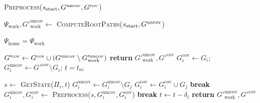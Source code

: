 \documentclass[conference]{IEEEtran}
\begin{document}
\begin{algorithm}
\caption{\textsc{Preprocess}($s_{\textrm{start}},G^{\textrm{uncov}},G^{\textrm{cov}} $)}\label{alg:2}
\begin{algorithmic}[1]
\State $\Psi_{\textrm{work}}, G'^{\textrm{uncov}}_{\textrm{work}} \leftarrow$ \textsc{ComputeRootPaths}($s_{\textrm{start}},G^{\textrm{uncov}}$)

\If {$\Sstart = \Shome$}
    \State $\Psi_{\textrm{home}} = \Psi_{\textrm{work}}$
\EndIf

\State $G'^{\textrm{cov}} \leftarrow 
    G^{\textrm{cov}} \cup (G^{\textrm{uncov}} \setminus G'^{\textrm{uncov}}_{\textrm{work}})$
    \State \textbf{return} $G'^{\textrm{uncov}}_{\textrm{work}}, G'^{\textrm{cov}}$
\EndIf
{}
    \State $G_i^{\textrm{cov}} \leftarrow G_i$;
            \hspace{2mm}
           $G_i^{\textrm{uncov}} \leftarrow G'^{\textrm{cov}} \setminus G_i$;
            \hspace{2mm}
           $t = t_{\textrm{rc}}$

        \State $s \leftarrow$ \textsc{GetState($\Pi_i, t$)}
                \State $G_i^{\textrm{uncov}} \leftarrow G_i^{\textrm{uncov}} \setminus G_j$
                \State $G_i^{\textrm{cov}} \leftarrow G_i^{\textrm{cov}} \cup G_j$
            \EndIf
        \EndFor
            \State \textbf{break}
        \EndIf
        \State $G_i^{\textrm{uncov}},G_i^{\textrm{cov}} \leftarrow$ \textsc{Preprocess}($s,G_i^{\textrm{uncov}},G_i^{\textrm{cov}}$)
            \State \textbf{break}
        \EndIf
        \State $t \leftarrow t - \delta_t$
    \EndWhile
\EndFor
\State \textbf{return} $G'^{\textrm{uncov}}_{\textrm{work}}, G'^{\textrm{cov}}$

\end{algorithmic}
\end{algorithm}

\end{document}
